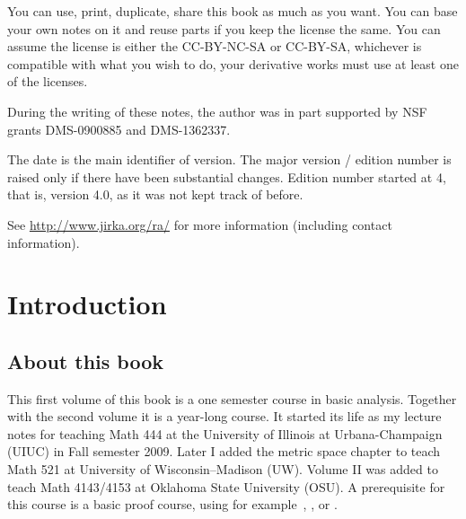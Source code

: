 \documentclass[12pt]{book}
\theoremstyle{plain}
\theoremstyle{remark}
\theoremstyle{definition}
\theoremstyle{exercise}
\theoremstyle{example}
\begin{document}
\bigskip

\noindent
You can use, print, duplicate, share this book as much as you want.  You can
base your own notes on it and reuse parts if you keep the license the
same.  You can assume the license is either the CC-BY-NC-SA or CC-BY-SA,
whichever is compatible with what you wish to do, your derivative works must
use at least one of the licenses.

\bigskip

\noindent
During the writing of these notes, 
the author was in part supported by NSF grants DMS-0900885 and
DMS-1362337.

\bigskip

\noindent
The date is the main identifier of version.  The major version / edition
number is raised only if there have been substantial changes.  Edition
number started at 4, that is, version 4.0, as it was not kept track of
before.  %

\bigskip

\noindent
See \url{http://www.jirka.org/ra/} for more information
(including contact information).



\tableofcontents
{}

\newpage


\chapter*{Introduction}


\section{About this book}

This first volume of this book is a one semester course in basic analysis.
Together with the second volume it is a year-long course.
It started its life
as my lecture notes for teaching Math 444 at the
University of Illinois at Urbana-Champaign (UIUC) in Fall semester 2009.
Later I added the metric space chapter to teach Math 521 at University of
Wisconsin--Madison (UW).
Volume II was added to teach Math 4143/4153 at Oklahoma State University
(OSU).
A prerequisite for this course is a basic proof course,
using 
for example~\cite{Hammack}, \cite{GIAM}, or \cite{DW}.
\end{document}

